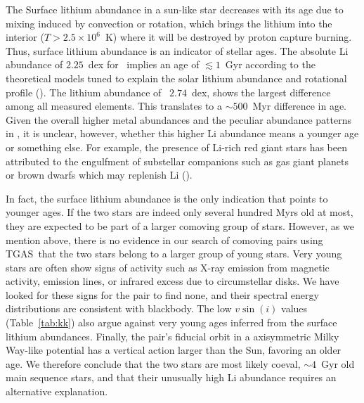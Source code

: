 \documentclass[modern, letterpaper]{aastex61}
\newcommand{\acronym}[1]{{\small{#1}}}
\newcommand{\tgas}{\acronym{TGAS}}
\newcommand*\elem[1]{\ensuremath{\mathrm{#1}}}
\newcommand{\sunanalog}{\text{Krios}}
\newcommand{\bizarreone}{\text{Kronos}}
\renewcommand\tablename{Table}
\begin{document}
The Surface lithium abundance in a sun-like star decreases with its age due to
mixing induced by convection or rotation, which brings the lithium into the
interior ($T>2.5 \times 10^{6}$~K) where it will be destroyed by proton capture
burning.
Thus, surface lithium abundance is an indicator of stellar ages.
The absolute $\elem{Li}$ abundance of $2.25$~dex for \sunanalog\ implies an age
of $\lesssim 1$~Gyr according to the theoretical models tuned to explain the
solar lithium abundance and rotational profile (\citealt{2005Sci...309.2189C}).
The lithium abundance of \bizarreone\, $2.74$~dex, shows the largest difference
among all measured elements.
This translates to a $\sim 500$~Myr difference in age.
Given the overall higher metal abundances and the peculiar abundance patterns
in \bizarreone, it is unclear, however, whether this higher $\elem{Li}$
abundance means a younger age or something else.
For example, the presence of $\elem{Li}$-rich red giant stars has been
attributed to the engulfment of substellar companions such as gas giant planets
or brown dwarfs which may replenish $\elem{Li}$ (\citealt{Casey:2016aa}).

In fact, the surface lithium abundance is the only indication that points to younger ages.
If the two stars are indeed only several hundred Myrs old at most,
they are expected to be part of a larger comoving group of stars.
However, as we mention above, there is no evidence in our search of comoving pairs
using \tgas\ that the two stars belong to a larger group of young stars.
Very young stars are often show signs of activity such as
X-ray emission from magnetic activity, emission lines, or infrared excess due to
circumstellar disks.
We have looked for these signs for the pair to find none, and their spectral energy
distributions are consistent with blackbody.
The low $v\sin(i)$ values (\tablename~\ref{tab:kk}) also argue against very
young ages inferred from the surface lithium abundances.
Finally, the pair's fiducial orbit in a axisymmetric Milky Way-like potential
has a vertical action larger than the Sun, favoring an older age.
We therefore conclude that the two stars are most likely coeval, $\sim 4$~Gyr old main
sequence stars, and that their unusually high \elem{Li} abundance requires an
alternative explanation.
\end{document}
